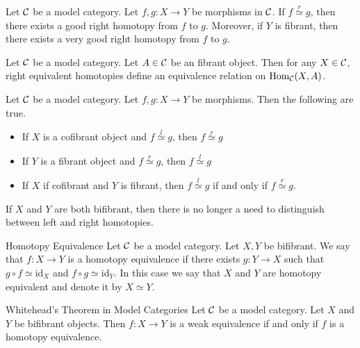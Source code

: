 \documentclass[a4paper]{article}
\begin{document}
\begin{prp}{}{} Let $\mathcal{C}$ be a model category. Let $f,g:X\to Y$ be morphisms in $\mathcal{C}$. If $f\overset{r}{\simeq}g$, then there exists a good right homotopy from $f$ to $g$. Moreover, if $Y$ is fibrant, then there exists a very good right homotopy from $f$ to $g$. 
\end{prp}

\begin{prp}{}{} Let $\mathcal{C}$ be a model category. Let $A\in\mathcal{C}$ be an fibrant object. Then for any $X\in\mathcal{C}$, right equivalent homotopies define an equivalence relation on $\operatorname{Hom}_{\mathcal{C}}(X,A)$. 
\end{prp}

\begin{thm}{}{} Let $\mathcal{C}$ be a model category. Let $f,g:X\to Y$ be morphisms. Then the following are true. 
\begin{itemize}
\item If $X$ is a cofibrant object and $f\overset{l}{\simeq}g$, then $f\overset{r}{\simeq}g$
\item If $Y$ is a fibrant object and $f\overset{r}{\simeq}g$, then $f\overset{l}{\simeq}g$
\item If $X$ if cofibrant and $Y$ is fibrant, then $f\overset{l}{\simeq}g$ if and only if $f\overset{r}{\simeq}g$. 
\end{itemize}
\end{thm}

If $X$ and $Y$ are both bifibrant, then there is no longer a need to distinguish between left and right homotopies. 

\begin{defn}{Homotopy Equivalence}{} Let $\mathcal{C}$ be a model category. Let $X,Y$ be bifibrant. We say that $f:X\to Y$ is a homotopy equivalence if there exists $g:Y\to X$ such that $g\circ f\simeq\text{id}_X$ and $f\circ g\simeq\text{id}_Y$. In this case we say that $X$ and $Y$ are homotopy equivalent and denote it by $X\simeq Y$. 
\end{defn}

\begin{thm}{Whitehead's Theorem in Model Categories}{} Let $\mathcal{C}$ be a model category. Let $X$ and $Y$ be bifibrant objects. Then $f:X\to Y$ is a weak equivalence if and only if $f$ is a homotopy equivalence. 
\end{thm}
\end{document}
